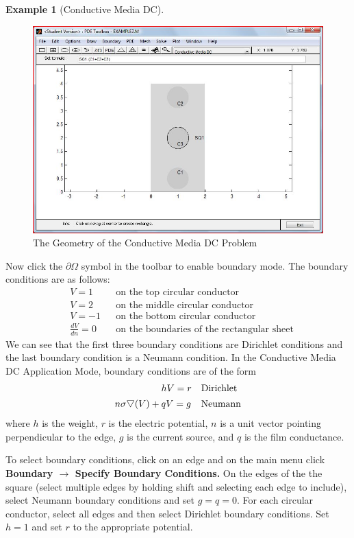 \documentclass{amsart}
\theoremstyle{definition}
\newtheorem{example}{Example}
\begin{document}
\begin{example}[Conductive Media DC]
\begin{figure}[ht]
   \includegraphics[height = 3 in]{DrawModeExample2}
   \caption{The Geometry of the Conductive Media DC Problem} \label{F:picture}
\end{figure}

Now click the $\partial \Omega$ symbol in the toolbar to enable boundary mode. 
The boundary conditions are as follows:
\begin{align*}
&V = 1              	&& \text{on the top circular conductor} \\
&V = 2              	&&\text{on the middle circular conductor} \\
&V = -1            	&&\text{on the bottom circular conductor} \\
&\frac{dV}{dn} = 0 	&&\text{on the boundaries of the rectangular sheet} 
\end{align*}
We can see that the first three boundary conditions are Dirichlet conditions and the last boundary condition is a Neumann condition. In the Conductive Media DC Application Mode, boundary conditions are of the form 
\begin{align*}
					&hV = r 	&& \text{Dirichlet} \\
n\sigma \raisebox{.4ex}{$\bigtriangledown$} (V) {}+{} 	&q V = g 	&&\text{Neumann}
\end{align*}
where $h$ is the weight, $r$ is the electric potential, $n$ is a unit vector pointing perpendicular to the edge, $g$ is the current source, and $q$ is the film conductance.

To select boundary conditions, click on an edge and on the main menu click \textbf{Boundary $\to$ Specify Boundary Conditions.} On the edges of the the square (select multiple edges by holding shift and selecting each edge to include), select Neumann boundary conditions and set $g = q = 0$. For each circular conductor, select all edges and then select Dirichlet boundary conditions. Set $h = 1$ and set $r$ to the appropriate potential. 


\end{example}
\end{document}
